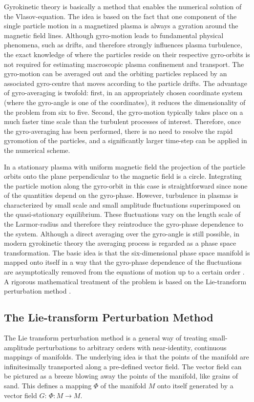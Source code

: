 \documentclass[a4paper,10pt]{article}
\begin{document}
Gyrokinetic theory is basically a method that enables the numerical solution of the Vlasov-equation. The idea is based on the fact that one component of the single particle motion in a magnetized plasma is always a gyration around the magnetic field lines. 
Although gyro-motion leads to fundamental physical phenomena, such as drifts, and therefore strongly influences plasma turbulence, the exact knowledge of where the particles reside on their respective gyro-orbits is not required for estimating macroscopic plasma confinement and transport. The gyro-motion can be averaged out and the orbiting particles replaced by an associated gyro-centre that moves according to the particle drifts. The advantage of gyro-averaging is twofold: first, in an appropriately chosen coordinate system (where the gyro-angle is one of the coordinates), it reduces the dimensionality of the problem from six to five. Second, the gyro-motion typically takes place on a much faster time scale than the turbulent processes of interest. Therefore, once the gyro-averaging has been performed, there is no need to resolve the rapid gyromotion of the particles, and a significantly larger time-step can be applied in the numerical scheme.

In a stationary plasma with uniform magnetic field the projection of the particle orbits onto the plane perpendicular to the magnetic field is a circle. Integrating the particle motion along the gyro-orbit in this case is straightforward since none of the quantities depend on the gyro-phase. 
However, turbulence in plasmas is characterized by small scale and small amplitude fluctuations superimposed on the quasi-stationary equilibrium. These fluctuations vary on the length scale of the Larmor-radius and therefore they reintroduce the gyro-phase dependence to the system. Although a direct averaging over the gyro-angle is still possible, in modern gyrokinetic theory the averaging process is regarded as a phase space transformation. The basic idea is that the six-dimensional phase space manifold is mapped onto itself in a way that the gyro-phase dependence of the fluctuations are asymptotically removed from the equations of motion up to a certain order \cite{brizard}. A rigorous mathematical treatment of the problem is based on the Lie-transform perturbation method \cite{littlejohn_gc}.


\subsection{The Lie-transform Perturbation Method} \label{sec:lie}
The Lie transform perturbation method is a general way of treating small-amplitude perturbations to arbitrary orders with near-identity, continuous mappings of manifolds. The underlying idea is that the points of the manifold are infinitesimally transported along a pre-defined vector field. The vector field can be pictured as a breeze blowing away the points of the manifold, like grains of sand. This defines a mapping $\Phi$ of the manifold $M$ onto itself generated by a vector field $G$: $\Phi: M \to M$. 
\end{document}
